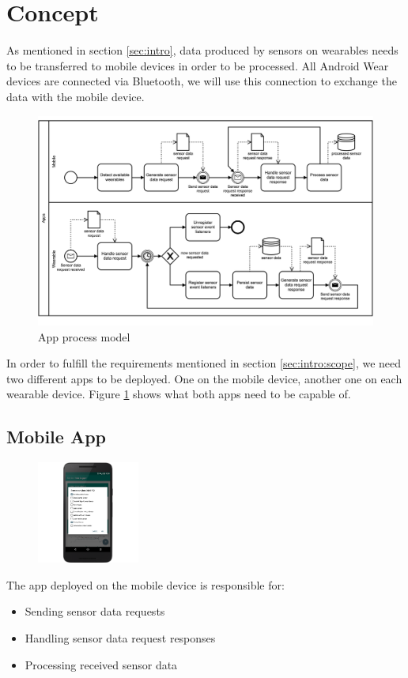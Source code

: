 \section{Concept}
\label{sec:concept}

As mentioned in section \ref{sec:intro}, data produced by sensors on wearables needs to be transferred to mobile devices in order to be processed.
All Android Wear devices are connected via Bluetooth, we will use this connection to exchange the data with the mobile device.

\begin{figure}[H]
	\includegraphics[width=\linewidth]{diagrams/apps.png}
	\caption[Caption for bpmn]{App process model}
	\label{fig:diagrams:apps}
\end{figure}

In order to fulfill the requirements mentioned in section \ref{sec:intro:scope}, we need two different apps to be deployed.
One on the mobile device, another one on each wearable device.
Figure \ref{fig:diagrams:apps} shows what both apps need to be capable of.

\clearpage

\subsection{Mobile App}
\label{sec:concept:mobileapp}
\begin{figure}
	\begin{center}
		\includegraphics[width=0.3\textwidth]{images/app/mobile.png}
	\end{center}
\end{figure}
The app deployed on the mobile device is responsible for:
\begin{itemize}[noitemsep]
	\item Sending sensor data requests
	\item Handling sensor data request responses
	\item Processing received sensor data
\end{itemize}

